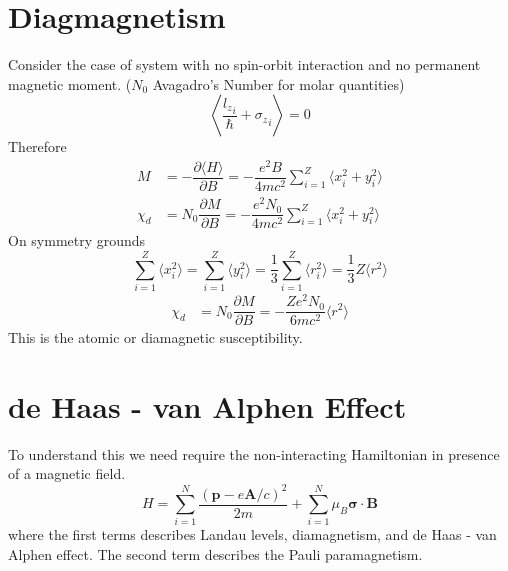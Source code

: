 \documentclass[aps,prb,onecolumn,notitlepage,showpacs,floatfix,superscriptaddress]{revtex4-1}
\begin{document}
\section{Diagmagnetism}
Consider the case of system with no spin-orbit interaction and no permanent magnetic moment. ($N_0$ Avagadro's Number for molar quantities)
\begin{equation}
\left\langle \dfrac{{l_z}_i}{\hbar}+{\sigma_z}_i \right\rangle =0
\end{equation}
Therefore
\begin{equation}
\begin{split}
M&=-\dfrac{\partial \langle H \rangle}{\partial B} = -\dfrac{e^2 B}{4 m c^2}  \sum_{i=1}^Z \langle x_i^2+y_i^2 \rangle\\
\chi_d &=N_0 \dfrac{\partial M}{\partial B} = -\dfrac{e^2 N_0}{4 m c^2}  \sum_{i=1}^Z \langle x_i^2+y_i^2 \rangle
\end{split}
\end{equation}
On symmetry grounds 
\begin{equation}
\sum_{i=1}^Z \langle x_i^2 \rangle = \sum_{i=1}^Z \langle y_i^2 \rangle = \dfrac{1}{3}\sum_{i=1}^Z \langle r_i^2 \rangle = \dfrac{1}{3} Z \langle r^2 \rangle
\end{equation}
\begin{equation}
\begin{split}
\chi_d &=N_0 \dfrac{\partial M}{\partial B} = -\dfrac{Z e^2 N_0}{6 m c^2}  \langle r^2 \rangle
\end{split}
\end{equation}
This is the atomic or diamagnetic susceptibility.

\section{de Haas - van Alphen Effect}
To understand this we need require the non-interacting Hamiltonian in presence of a magnetic field.
\begin{equation}
H=\sum_{i=1}^{N} \dfrac{({\bm p}-e{\bm A} /c)^2}{2m} + \sum_{i=1}^{N} \mu_B {\bm \sigma} \cdot {\bm B}
\end{equation}
where the first terms describes Landau levels, diamagnetism, and de Haas - van Alphen effect. The second term describes the Pauli paramagnetism.
\end{document}
